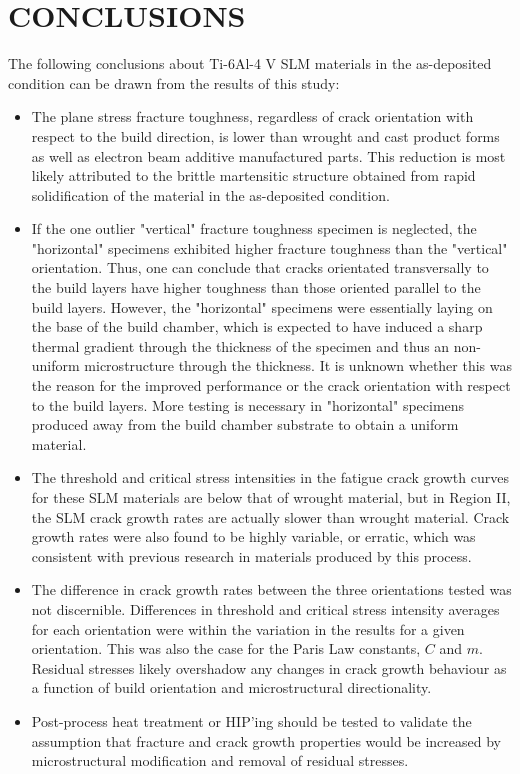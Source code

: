 \documentclass[10pt]{article}
\begin{document}
\section*{CONCLUSIONS}
The following conclusions about Ti-6Al-4 V SLM materials in the as-deposited condition can be drawn from the results of this study:

\begin{itemize}
  \item The plane stress fracture toughness, regardless of crack orientation with respect to the build direction, is lower than wrought and cast product forms as well as electron beam additive manufactured parts. This reduction is most likely attributed to the brittle martensitic structure obtained from rapid solidification of the material in the as-deposited condition.

  \item If the one outlier "vertical" fracture toughness specimen is neglected, the "horizontal" specimens exhibited higher fracture toughness than the "vertical" orientation. Thus, one can conclude that cracks orientated transversally to the build layers have higher toughness than those oriented parallel to the build layers. However, the "horizontal" specimens were essentially laying on the base of the build chamber, which is expected to have induced a sharp thermal gradient through the thickness of the specimen and thus an non-uniform microstructure through the thickness. It is unknown whether this was the reason for the improved performance or the crack orientation with respect to the build layers. More testing is necessary in "horizontal" specimens produced away from the build chamber substrate to obtain a uniform material.

  \item The threshold and critical stress intensities in the fatigue crack growth curves for these SLM materials are below that of wrought material, but in Region II, the SLM crack growth rates are actually slower than wrought material. Crack growth rates were also found to be highly variable, or erratic, which was consistent with previous research in materials produced by this process.

  \item The difference in crack growth rates between the three orientations tested was not discernible. Differences in threshold and critical stress intensity averages for each orientation were within the variation in the results for a given orientation. This was also the case for the Paris Law constants, $C$ and $m$. Residual stresses likely overshadow any changes in crack growth behaviour as a function of build orientation and microstructural directionality.

  \item Post-process heat treatment or HIP'ing should be tested to validate the assumption that fracture and crack growth properties would be increased by microstructural modification and removal of residual stresses.

\end{itemize}
\end{document}
